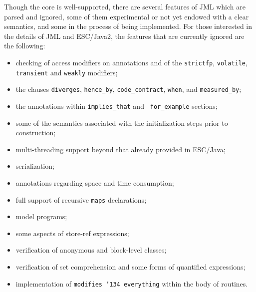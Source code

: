 \documentclass{llncs}
\begin{document}
Though the core is well-supported, there are several features of JML
which are parsed and ignored, some of them experimental or not yet
endowed with a clear semantics, and some in the process of being
implemented.  For those interested in the details of JML and
ESC/Java2, the features that are currently ignored are the following:
\setlength{\partopsep}{0in}\setlength{\parskip}{0in}\setlength{\itemsep}{0in}\setlength{\topsep}{0in}
\begin{itemize}
\setlength{\partopsep}{0in}\setlength{\parskip}{0in}\setlength{\itemsep}{0in}\setlength{\topsep}{0in}
\item checking of access modifiers on annotations and of the
 \texttt{strictfp}, \texttt{volatile},
  \texttt{transient} and \texttt{weakly} modifiers;
\item the clauses \texttt{diverges}, \texttt{hence\_by},
  \texttt{code\_contract}, \texttt{when}, and \texttt{measured\_by};
\item the annotations within \texttt{implies\_that} and {\tt
    for\_example} sections;
\item some of the semantics associated with the initialization steps prior to
  construction;
\item multi-threading support beyond that already provided in ESC/Java;
\item serialization;
\item annotations regarding space and time consumption;
\item full support of recursive \texttt{maps} declarations;
\item model programs;
\item some aspects of store-ref expressions;
\item verification of anonymous and block-level classes;
\item verification of set comprehension and some forms of quantified
  expressions;
\item implementation of \texttt{modifies \char'134 everything} within
  the body of routines.
\end{itemize}


\end{document}
